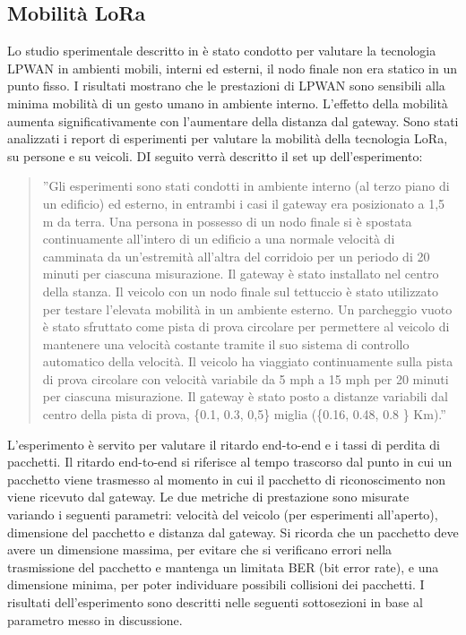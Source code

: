 \documentclass[a4paper]{report} %
\begin{document}
\subsection{Mobilità LoRa}
Lo studio sperimentale descritto in \cite{art:rif.47} è stato condotto per valutare la tecnologia LPWAN in ambienti mobili, interni ed esterni, il nodo finale non era statico in un punto fisso. I risultati mostrano che le prestazioni di LPWAN sono sensibili alla minima mobilità di un gesto umano in ambiente interno. L'effetto della mobilità aumenta significativamente con l'aumentare della distanza dal gateway. %
Sono stati analizzati i report di esperimenti per valutare la mobilità della tecnologia LoRa, su persone e su veicoli. DI seguito verrà descritto il set up dell'esperimento:
\begin{quote}
	''Gli esperimenti sono stati condotti in ambiente interno (al terzo piano di un edificio) ed esterno, in entrambi i casi il gateway era posizionato a 1,5 m da terra. 
	Una persona in possesso di un nodo finale si è spostata continuamente all'intero di un edificio a una normale velocità di camminata da un'estremità all'altra del corridoio per un periodo di 20 minuti per ciascuna misurazione. Il gateway è stato installato nel centro della stanza. 
	Il veicolo con un nodo finale sul tettuccio è stato utilizzato per testare l'elevata mobilità in un ambiente esterno. Un parcheggio vuoto è stato sfruttato come pista di prova circolare per permettere al veicolo di mantenere una velocità costante tramite il suo sistema di controllo automatico della velocità. Il veicolo ha viaggiato continuamente sulla pista di prova circolare con velocità variabile da 5 mph a 15 mph per 20 minuti per ciascuna misurazione. Il gateway è stato posto a distanze variabili dal centro della pista di prova, \{0.1, 0.3, 0,5\} miglia (\{0.16, 0.48, 0.8 \} Km).''
\end{quote} 
L'esperimento è servito per valutare il ritardo end-to-end e i tassi di perdita di pacchetti. Il ritardo end-to-end si riferisce al tempo trascorso dal punto in cui un pacchetto viene trasmesso al momento in cui il pacchetto di riconoscimento non viene ricevuto dal gateway. Le due metriche di prestazione sono misurate variando i seguenti parametri: velocità del veicolo (per esperimenti all'aperto), dimensione del pacchetto e distanza dal gateway. 
Si ricorda che un pacchetto deve avere un dimensione massima, per evitare che si verificano errori nella trasmissione del pacchetto e mantenga un limitata BER (bit error rate), e una dimensione minima, per poter individuare possibili collisioni dei pacchetti.
I risultati dell'esperimento sono descritti nelle seguenti sottosezioni in base al parametro messo in discussione.
\end{document}
